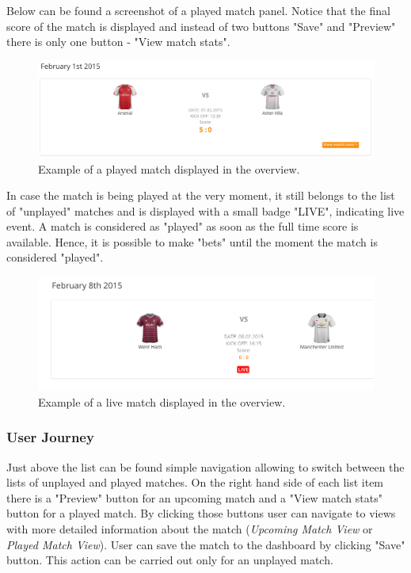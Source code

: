 Below can be found a screenshot of a played match panel. Notice that the final score of the match is displayed and instead of two buttons "Save" and "Preview" there is only one button - "View match stats".

\begin{figure}[H]
	\begin{center}
		\includegraphics[width=.90\linewidth,natwidth=610,natheight=642]{impl/images/playedMatch}
		\caption{Example of a played match displayed in the overview.} \label{fig:using:playedmatch}
	\end{center}
\end{figure}

In case the match is being played at the very moment, it still belongs to the list of "unplayed" matches and is displayed with a small badge "LIVE", indicating live event. A match is considered as "played" as soon as the full time score is available. Hence, it is possible to make "bets" until the moment the match is considered "played".

\begin{figure}[H]
	\begin{center}
		\includegraphics[width=.90\linewidth,natwidth=610,natheight=642]{impl/images/liveMatch}
		\caption{Example of a live match displayed in the overview.} \label{fig:using:livematch}
	\end{center}
\end{figure}

\subsubsection*{User Journey}
\label{subsec:matchesoviewuserjourney}
Just above the list can be found simple navigation allowing to switch between the lists of unplayed and played matches. On the right hand side of each list item there is a "Preview" button for an upcoming match and a "View match stats" button for a played match. By clicking those buttons user can navigate to views with more detailed information about the match (\emph{Upcoming Match View} or \emph{Played Match View}). User can save the match to the dashboard by clicking "Save" button. This action can be carried out only for an unplayed match.  


